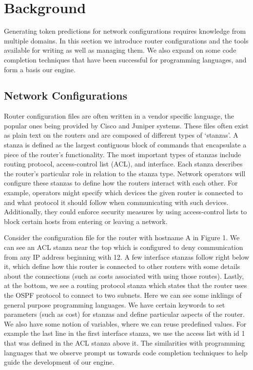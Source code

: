 \section{Background}

Generating token predictions for network configurations requires knowledge from multiple domains. In this section we introduce router configurations and the tools available for writing as well as managing them. We also expand on some code completion techniques that have been successful for programming languages, and form a basis our engine.

\subsection{Network Configurations} 

Router configuration files are often written in a vendor specific language, the popular ones being provided by Cisco and Juniper systems. These files often exist as plain text on the routers and are composed of different types of `stanzas'. A stanza is defined as the largest contiguous block of commands that encapsulate a piece of the router's functionality. The most important types of stanzas include routing protocol, access-control list (ACL), and interface. Each stanza describes the router's particular role in relation to the stanza type. Network operators will configure these stanzas to define how the routers interact with each other. For example, operators might specify which devices the given router is connected to and what protocol it should follow when communicating with such devices. Additionally, they could enforce security measures by using access-control lists to block certain hosts from entering or leaving a network. 

 Consider the configuration file for the router with hostname A in Figure 1. We can see an ACL stanza near the top which is configured to deny communication from any IP address beginning with 12. A few interface stanzas follow right below it, which define how this router is connected to other routers with some details about the connections (such as costs associated with using those routes). Lastly, at the bottom, we see a routing protocol stanza which states that the router uses the OSPF protocol to connect to two subnets. Here we can see some inklings of general purpose programming languages. We have certain keywords to set parameters (such as cost) for stanzas and define particular aspects of the router. We also have some notion of variables, where we can reuse predefined values. For example the last line in the first interface stanza, we use the access list with id 1 that was defined in the ACL stanza above it. The similarities with programming languages that we observe prompt us towards code completion techniques to help guide the development of our engine.

